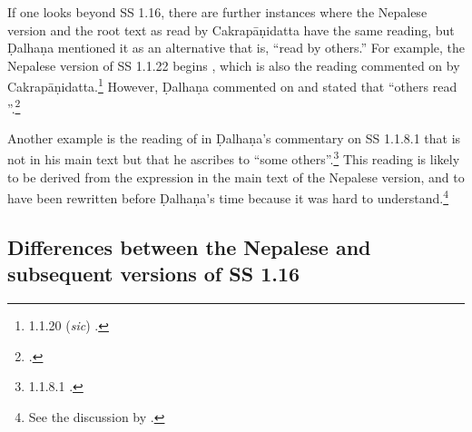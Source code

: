If one looks beyond SS 1.16, there are further instances where the Nepalese version and
the root text as read by Cakrapāṇidatta have the same reading, but Ḍalhaṇa
mentioned it as an alternative that is, “read by others.” For example, the Nepalese
version of SS 1.1.22 begins , which is also
the reading commented on by Cakrapāṇidatta.\footnote{1.1.20 (\emph{sic})
    \citep[17]{acar-1939}.} However, Ḍalhaṇa commented on  and
    stated that “others read ”.\footnote{.}
        
Another example is the reading of  in Ḍalhaṇa's commentary
on SS 1.1.8.1 that is not in his main text but that he ascribes to “some
others”.\footnote{1.1.8.1 \citep[3]{vulgate}.} This reading is likely to be derived  from 
the 
expression  in the main text of the Nepalese version, and to 
have been rewritten before Ḍalhaṇa's time because it was hard to 
understand.\footnote{See the discussion by \citet[4--5]{birc-2021a}.}


\subsection{Differences between the Nepalese and subsequent versions of SS 
1.16}


